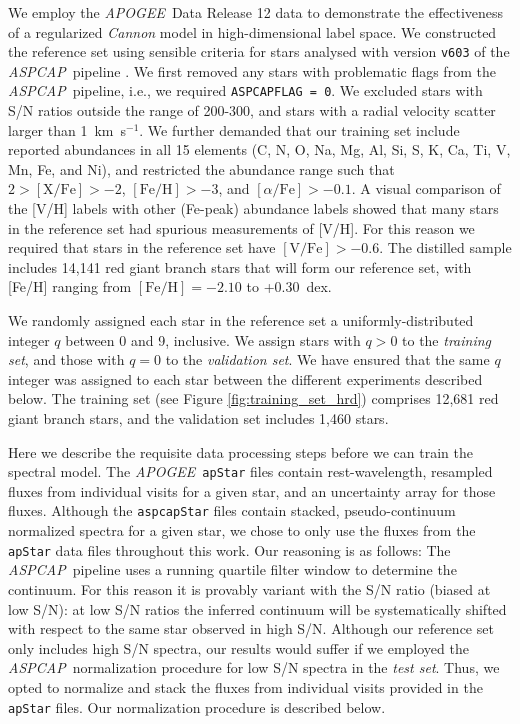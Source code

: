 \documentclass[12pt,preprint]{aastex}
\newcommand{\project}[1]{\textsl{#1}}
\newcommand{\acronym}[1]{{\small{#1}}}
\newcommand{\apogee}{\project{\acronym{APOGEE}}}
\newcommand{\aspcap}{\project{\acronym{ASPCAP}}}
\begin{document}
We employ the \apogee\ Data Release 12 data \citep{Alam_2015} to demonstrate the effectiveness of
a regularized \emph{Cannon} model in high-dimensional label space.  We 
constructed the reference set using sensible criteria for stars analysed with 
version \texttt{v603} of the \aspcap\ pipeline \citep{Holtzman_2015,Garcia_Perez_2015}.  We first removed 
any stars with problematic flags from the \aspcap\ pipeline, i.e., we required 
\texttt{ASPCAPFLAG~=~0}.  We excluded stars with S/N ratios outside the range of
200-300, and stars with a radial velocity scatter larger than 1~km~s$^{-1}$.  We
further demanded that our training set include reported abundances in all 15 
elements (C, N, O, Na, Mg, Al, Si, S, K, Ca, Ti, V, Mn, Fe, and Ni), and 
restricted the abundance range such that $2 > \mathrm{[X/Fe]} > -2$, 
$\mathrm{[Fe/H]} > -3$, and $[\alpha/\mathrm{Fe}] > -0.1$.  A visual comparison 
of the [V/H] labels with other (Fe-peak) abundance labels showed that many stars
in the reference set had spurious measurements of [V/H].  For this reason we 
required that stars in the reference set have $\mathrm{[V/Fe]} > -0.6$.  The 
distilled sample includes 14,141 red giant branch stars that will form our 
reference set, with [Fe/H] ranging from $\mathrm{[Fe/H]} = -2.10$ to 
+0.30~dex.


We randomly assigned each star in the reference set a uniformly-distributed 
integer $q$ between 0 and 9, inclusive.  We assign stars with $q > 0$
 to the \emph{training set}, and those with $q = 0$ to the \emph{validation set}. We have ensured that the same $q$ integer was assigned to each star 
between the different experiments described below.  The training set (see Figure
\ref{fig:training_set_hrd}) comprises 12,681 red giant branch stars, and the 
validation set includes 1,460 stars.


Here we describe the requisite data processing steps before we can train the 
spectral model.  The \apogee\ \texttt{apStar} files contain rest-wavelength, 
resampled fluxes from individual visits for a given star, and an uncertainty array for
those fluxes.  Although the \texttt{aspcapStar} files contain stacked, 
pseudo-continuum normalized spectra for a given star, we chose to only use the 
fluxes from the \texttt{apStar} data files throughout this work.  Our reasoning 
is as follows: The \aspcap\ pipeline uses a running quartile filter window to determine 
the continuum.  For this reason it is provably variant with the S/N ratio (biased at low S/N): at 
low S/N ratios the inferred continuum will be systematically shifted with 
respect to the same star observed in high S/N.  Although our reference set only 
includes high S/N spectra, our results would suffer if we employed the \aspcap\ 
normalization procedure for low S/N spectra in the \emph{test set}.  Thus, we 
opted to normalize and stack the fluxes from individual visits provided in the 
\texttt{apStar} files. Our normalization procedure is described below.
\end{document}
